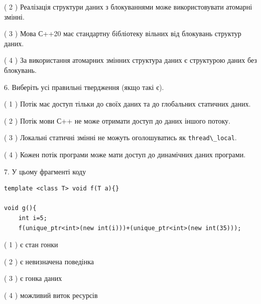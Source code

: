 \documentclass[12pt, ukrainian]{article}
\def\code#1{\Verb!#1!}
\begin{document}
\begin {large}
{( 2 ) Реалізація структури даних з блокуваннями може використовувати атомарні змінні.%

( 3 ) Мова С++20 має стандартну бібліотеку вільних від блокувань структур даних.%

( 4 ) За використання атомарних змінних структура даних є структурою даних без блокувань.%
\newpage



\vspace{5mm}
6. Виберіть усі правильні твердження (якщо такі є).\par
\vspace{2mm}

( 1 ) Потік має доступ тільки до своїх даних та до глобальних статичних даних.%

( 2 ) Потік мови С++ не може отримати доступ до даних іншого потоку.%

( 3 ) Локальні статичні змінні не можуть оголошуватись як \code{thread\_local}.%

( 4 ) Кожен потік програми може мати доступ до динамічних даних програми.%


\vspace{5mm}
7. У цьому фрагменті коду
\begin{verbatim}
template <class T> void f(T a){}

void g(){
    int i=5;
    f(unique_ptr<int>(new int(i)))+(unique_ptr<int>(new int(35)));
\end{verbatim}
( 1 ) є стан гонки%

( 2 ) є невизначена поведінка%

( 3 ) є гонка даних%

( 4 ) можливий виток ресурсів%
}
\end {large}
\end{document}
